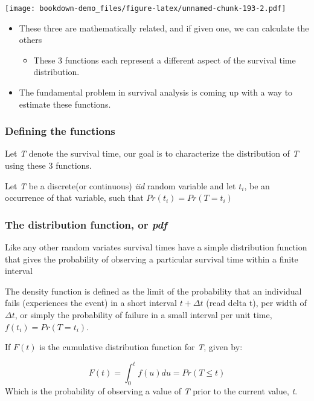 \documentclass[
]{article}
\providecommand{\tightlist}{%
  \setlength{\itemsep}{0pt}\setlength{\parskip}{0pt}}
\begin{document}
\texttt{[image: bookdown-demo\_files/figure-latex/unnamed-chunk-193-2.pdf]}

\begin{itemize}
\tightlist
\item
  These three are mathematically related, and if given one, we can calculate the others

  \begin{itemize}
  \tightlist
  \item
    These 3 functions each represent a different aspect of the survival time distribution.
  \end{itemize}
\item
  The fundamental problem in survival analysis is coming up with a way to estimate these functions.
\end{itemize}

\hypertarget{defining-the-functions}{%
\subsubsection{Defining the functions}\label{defining-the-functions}}

Let \emph{T} denote the survival time, our goal is to characterize the distribution of \emph{T} using these 3 functions.

Let \emph{T} be a discrete(or continuous) \emph{iid} random variable and let \(t_i\), be an occurrence of that variable, such that \(Pr(t_i)=Pr(T=t_i)\)

\hypertarget{the-distribution-function-or-pdf}{%
\subsubsection{\texorpdfstring{The distribution function, or \emph{pdf}}{The distribution function, or pdf}}\label{the-distribution-function-or-pdf}}

Like any other random variates survival times have a simple distribution function that gives the probability of observing a particular survival time within a finite interval

The density function is defined as the limit of the probability that an individual fails (experiences the event) in a short interval \(t+\Delta t\) (read delta t), per width of \(\Delta t\), or simply the probability of failure in a small interval per unit time, \(f(t_i) = Pr(T=t_i)\).

If \(F(t)\) is the cumulative distribution function for \emph{T}, given by:

\[ F(t) = \int_{0}^{t} f(u) du = Pr(T \leqslant t )\]
Which is the probability of observing a value of \emph{T} prior to the current value, \emph{t}.
\end{document}
